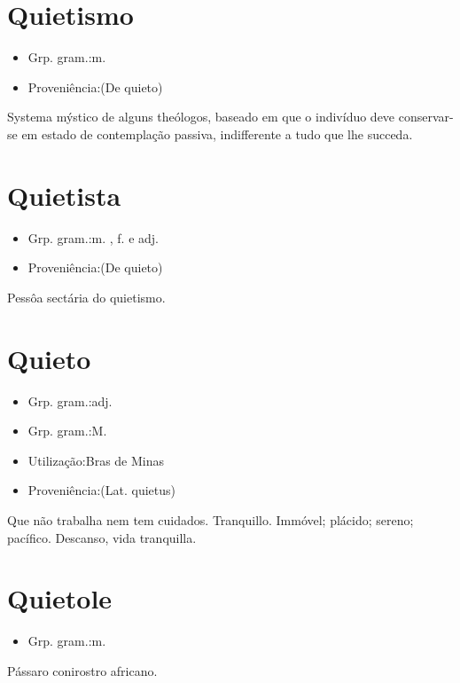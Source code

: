 \section{Quietismo}
\begin{itemize}
\item {Grp. gram.:m.}
\end{itemize}
\begin{itemize}
\item {Proveniência:(De \textunderscore quieto\textunderscore )}
\end{itemize}
Systema mýstico de alguns theólogos, baseado em que o indivíduo deve conservar-se em estado de contemplação passiva, indifferente a tudo que lhe succeda.
\section{Quietista}
\begin{itemize}
\item {Grp. gram.:m. ,  f.  e  adj.}
\end{itemize}
\begin{itemize}
\item {Proveniência:(De \textunderscore quieto\textunderscore )}
\end{itemize}
Pessôa sectária do quietismo.
\section{Quieto}
\begin{itemize}
\item {Grp. gram.:adj.}
\end{itemize}
\begin{itemize}
\item {Grp. gram.:M.}
\end{itemize}
\begin{itemize}
\item {Utilização:Bras de Minas}
\end{itemize}
\begin{itemize}
\item {Proveniência:(Lat. \textunderscore quietus\textunderscore )}
\end{itemize}
Que não trabalha nem tem cuidados.
Tranquillo.
Immóvel; plácido; sereno; pacífico.
Descanso, vida tranquilla.
\section{Quietole}
\begin{itemize}
\item {Grp. gram.:m.}
\end{itemize}
Pássaro conirostro africano.
